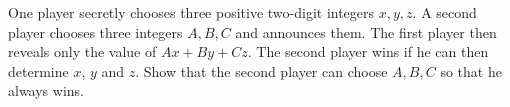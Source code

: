 One player secretly chooses three positive two-digit integers $x,y,z$. A second player chooses three integers $A,B,C$ and announces them. The first player then reveals only the value of $Ax+By+Cz$. The second player wins if he can then determine $x$, $y$ and $z$. Show that the second player can choose $A,B,C$ so that he always wins.

